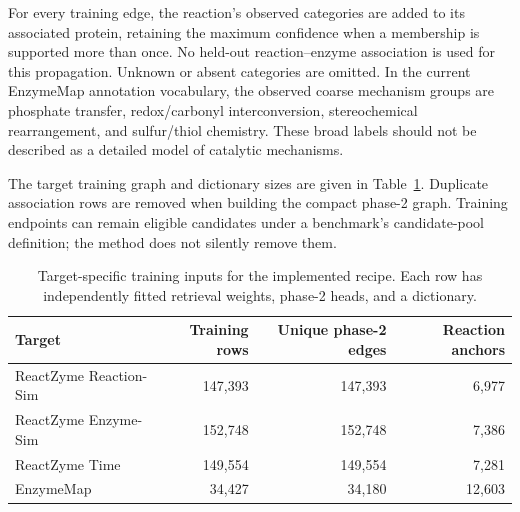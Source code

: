 For every training edge, the reaction's observed categories are added to its
associated protein, retaining the maximum confidence when a membership is
supported more than once. No held-out reaction--enzyme association is used
for this propagation. Unknown or absent categories are omitted. In the
current EnzymeMap annotation vocabulary, the observed coarse mechanism groups
are phosphate transfer, redox/carbonyl interconversion, stereochemical
rearrangement, and sulfur/thiol chemistry. These broad labels should not be
described as a detailed model of catalytic mechanisms.

The target training graph and dictionary sizes are given in
Table~\ref{tab:v4-targets}. Duplicate association rows are removed when
building the compact phase-2 graph. Training endpoints can remain eligible
candidates under a benchmark's candidate-pool definition; the method does
not silently remove them.

\begin{table}[ht]
\centering
\small
\begin{tabular}{lrrr}
\toprule
Target & Training rows & Unique phase-2 edges & Reaction anchors\\
\midrule
ReactZyme Reaction-Sim & 147,393 & 147,393 & 6,977\\
ReactZyme Enzyme-Sim & 152,748 & 152,748 & 7,386\\
ReactZyme Time & 149,554 & 149,554 & 7,281\\
EnzymeMap & 34,427 & 34,180 & 12,603\\
\bottomrule
\end{tabular}
\caption{Target-specific training inputs for the implemented recipe. Each row
has independently fitted retrieval weights, phase-2 heads, and a dictionary.}
\label{tab:v4-targets}
\end{table}

